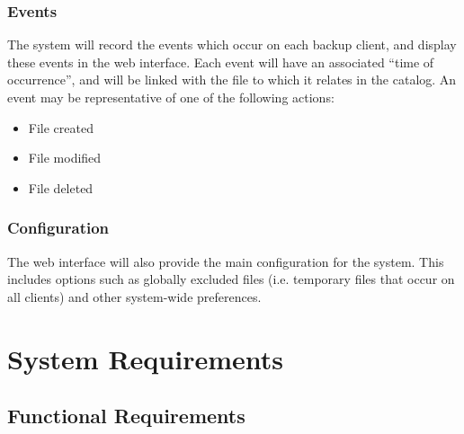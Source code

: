 \subsubsection{Events}

The system will record the events which occur on each backup client, and
display these events in the web interface. Each event will have an associated
``time of occurrence'', and will be linked with the file to which it relates in
the catalog. An event may be representative of one of the following actions:

\begin{itemize}
    \item File created
    \item File modified
    \item File deleted
\end{itemize}

\subsubsection{Configuration}

The web interface will also provide the main configuration for the system. This
includes options such as globally excluded files (i.e. temporary files that
occur on all clients) and other system-wide preferences.

\section{System Requirements}

\subsection{Functional Requirements}

